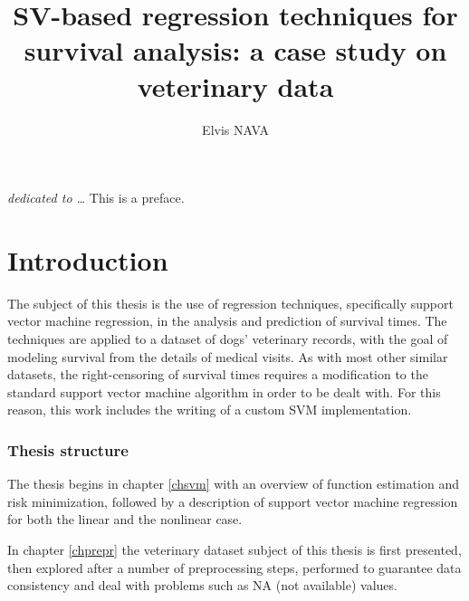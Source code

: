 \documentclass[12pt]{report}
\begin{document}
\title{SV-based regression techniques for survival analysis: a case study on veterinary data}
\author{Elvis NAVA}
%
% 
%
\beforepreface
{}
\vspace*{\fill}
{\hfill \Large {\sl dedicated to \dots}}
\vspace*{\fill}
% 
%
This is a preface.
%
%

\afterpreface


\chapter*{Introduction}
\label{intro}
The subject of this thesis is the use of regression techniques, specifically support vector machine regression, in the analysis and prediction of survival times. The techniques are applied to a dataset of dogs' veterinary records, with the goal of modeling survival from the details of medical visits. As with most other similar datasets, the right-censoring of survival times requires a modification to the standard support vector machine algorithm in order to be dealt with. For this reason, this work includes the writing of a custom SVM implementation.

\subsection*{Thesis structure}
The thesis begins in chapter \ref{chsvm} with an overview of function estimation and risk minimization, followed by a description of support vector machine regression for both the linear and the nonlinear case.

In chapter \ref{chprepr} the veterinary dataset subject of this thesis is first presented, then explored after a number of preprocessing steps, performed to guarantee data consistency and deal with problems such as NA (not available) values.
\end{document}
